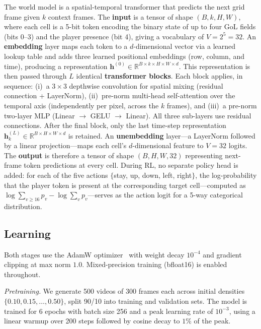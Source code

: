 The world model is a spatial-temporal transformer that predicts the next
grid frame given $k$ context frames.
%
The \textbf{input} is a tensor of shape $(B, k, H, W)$, where each cell
is a 5-bit token encoding the binary state of up to four GoL fields
(bits 0--3) and the player presence (bit 4), giving a vocabulary of
$V = 2^5 = 32$.
%
An \textbf{embedding} layer maps each token to a $d$-dimensional vector
via a learned lookup table and adds three learned positional embeddings
(row, column, and time), producing a representation
$\mathbf{h}^{(0)} \in \mathbb{R}^{B \times k \times H \times W \times d}$.
%
This representation is then passed through $L$ identical
\textbf{transformer blocks}.  Each block applies, in sequence:
(i)~a $3 \times 3$ depthwise convolution for spatial mixing (residual
connection + LayerNorm),
(ii)~pre-norm multi-head self-attention over the temporal axis
(independently per pixel, across the $k$ frames), and
(iii)~a pre-norm two-layer MLP (Linear $\to$ GELU $\to$ Linear).
All three sub-layers use residual connections.
%
After the final block, only the last time-step representation
$\mathbf{h}^{(L)}_{k} \in \mathbb{R}^{B \times H \times W \times d}$
is retained.
%
An \textbf{unembedding} layer---a LayerNorm followed by a linear
projection---maps each cell's $d$-dimensional feature to $V = 32$
logits.
%
The \textbf{output} is therefore a tensor of shape
$(B, H, W, 32)$ representing next-frame token predictions at every cell.
%
During RL, no separate policy head is added: for each of the five
actions $\{$stay, up, down, left, right$\}$, the log-probability that
the player token is present at the corresponding target cell---computed
as $\log \sum_{v \geq 16} p_v - \log \sum_{v} p_v$---serves as the
action logit for a 5-way categorical distribution.

\subsection{Learning}

Both stages use the AdamW optimizer~\citep{loshchilov2019decoupledweightdecayregularization} with weight decay $10^{-4}$ and gradient clipping at max norm $1.0$. Mixed-precision training (bfloat16) is enabled throughout.

\textit{Pretraining.}
We generate 500 videos of 300 frames each across initial densities $\{0.10, 0.15, \ldots, 0.50\}$, split 90/10 into training and validation sets.
The model is trained for 6 epochs with batch size 256 and a peak learning rate of $10^{-3}$, using a linear warmup over 200 steps followed by cosine decay to $1\%$ of the peak.

